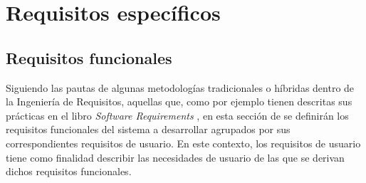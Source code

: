 \section{Requisitos específicos}
    \label{req:especificos}

    \subsection{Requisitos funcionales}
        \label{req:especificos:funcionales}

        Siguiendo las pautas de algunas metodologías tradicionales o híbridas dentro de la Ingeniería de Requisitos, aquellas que, como por ejemplo tienen descritas sus prácticas en el libro \textit{Software Requirements} \cite{wiegers_software_2013}, en esta sección de se definirán los requisitos funcionales del sistema a desarrollar agrupados por sus correspondientes requisitos de usuario. En este contexto, los requisitos de usuario tiene como finalidad describir las necesidades de usuario de las que se derivan dichos requisitos funcionales. 


